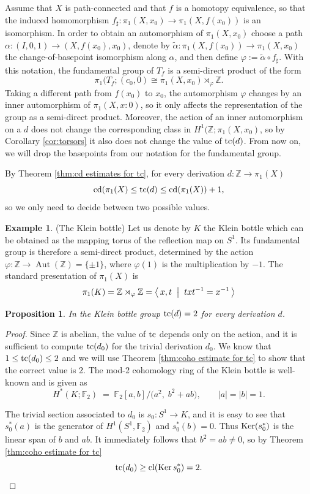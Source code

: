 \documentclass[11pt]{amsart}
\theoremstyle{plain}
\newtheorem{proposition}[theorem]{Proposition}
\theoremstyle{definition}
\newtheorem{example}[theorem]{Example}
\newcommand{\ZZ}{{\mathbb{Z}}}
\newcommand{\Ker}{\mathop{\rm Ker}\nolimits}
\newcommand{\cl}{\mathop{\rm cl}\nolimits}
\newcommand{\tc}{\mathop{\rm tc}\nolimits}
\newcommand{\cd}{\mathrm{cd}}
\DeclareMathOperator{\Aut}{Aut}
\begin{document}
Assume that $X$ is path-connected and that $f$ is a homotopy equivalence, so that 
the induced homomorphism $f_\sharp\colon \pi_1(X,x_0)\to \pi_1(X,f(x_0))$ is an isomorphism.
In order to obtain an automorphism of $\pi_1(X,x_0)$ choose a path $\alpha\colon (I,0,1)\to (X,f(x_0),x_0)$,
denote by $\widetilde{\alpha}\colon\pi_1(X,f(x_0))\to \pi_1(X,x_0)$ the change-of-basepoint isomorphism
along $\alpha$, and then define $\varphi:=\widetilde\alpha\circ f_\sharp$. With this notation, the fundamental
group of $T_f$ is a semi-direct product of the form
$$\pi_1(T_f;(c_0,0)\cong \pi_1(X,x_0)\rtimes_{\varphi}\mathbb Z.$$
Taking a different path from $f(x_0)$ to $x_0$, the automorphism $\varphi$ changes by an inner
automorphism of $\pi_1(X,x:0)$, so it only affects the representation of the group as a semi-direct 
product. Moreover, the action of an inner automorphism on a $d$ does not change the corresponding
class in $H^1(\ZZ; \pi_1(X,x_0)$, so by Corollary \ref{cor:torsors} it also does not change the 
value of $\tc(d)$. From now on, we will drop the basepoints from our notation for the fundamental
group. 

By Theorem \ref{thm:cd estimates for tc}, for every derivation $d\colon\ZZ\to\pi_1(X)$
$$\cd(\pi_1(X)\le \tc(d)\le\cd(\pi_1(X))+1,$$
so we only need to decide between two possible values.


\begin{example} (The Klein bottle) \label{ex:Klein bottle}
Let us denote by $K$ the Klein bottle which can be  obtained 
as the mapping torus of the 
reflection map on $S^1$. Its fundamental group is therefore a semi-direct product, determined by 
the action $\varphi\colon\ZZ\to \Aut(\ZZ)=\{\pm 1\}$, where $\varphi(1)$ is the multiplication by $-1$.
The standard presentation of $\pi_1(X)$ is
$$\pi_1(K)=\ZZ\rtimes_\varphi \ZZ=\bigl\langle\, x,t \;\bigm|\; txt^{-1}=x^{-1} \,\bigr\rangle$$    

\begin{proposition}
In the Klein bottle group $\tc(d)=2$ for every derivation $d$.   
\end{proposition}
\begin{proof}
Since $\ZZ$ is abelian, the value of $\tc$ depends only on the action, and it is sufficient to
compute $\tc(d_0)$ for the trivial derivation $d_0$.
We know that $1\le\tc(d_0)\le 2$ and we will use Theorem \ref{thm:coho estimate for tc} to show that 
the correct value is 2. The mod-2 cohomology ring of the Klein bottle is well-known and is given as
$$ H^*(K;\mathbb{F}_2)\;=\;\mathbb{F}_2[a,b]\big/\bigl(a^2,\;b^2+ab\bigr),   \qquad |a|=|b|=1. $$

The trivial section associated to $d_0$ is $s_0\colon S^1\to K$, and it is easy to see that 
$s_0^\ast(a)$ is the generator of $H^1(S^1,\mathbb{F}_2)$ and $s_0^\ast(b)=0$. Thus
$\Ker(s_0^\ast)$ is the linear span of $b$ and  $ab$. It immediately follows that $b^2=ab\ne 0$, 
so by Theorem \ref{thm:coho estimate for tc}
$$\tc(d_0)\ge\cl(\Ker s_0^\ast)=2.$$
\end{proof}
\end{example}
\end{document}
